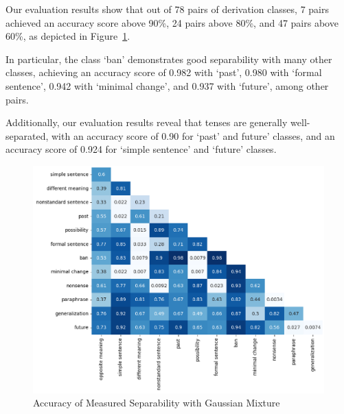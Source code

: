 \documentclass[11pt]{article}
\begin{document}
Our evaluation results show that out of 78 pairs of derivation classes, 7 pairs
achieved an accuracy score above 90\%, 24 pairs above 80\%, and 47 pairs above
60\%, as depicted in Figure~\ref{fig:GM}.

In particular, the class `ban' demonstrates good separability with many other
classes, achieving an accuracy score of 0.982 with `past', 0.980 with `formal
sentence', 0.942 with `minimal change', and 0.937 with `future', among other
pairs.

Additionally, our evaluation results reveal that tenses are generally
well-separated, with an accuracy score of 0.90 for `past' and future' classes,
and an accuracy score of 0.924 for `simple sentence' and `future' classes.

\begin{figure}[htp]
    \centering
    \includegraphics[scale=0.4]{figs/GM.png}
    \caption{Accuracy of Measured Separability with Gaussian
    Mixture}\label{fig:GM}
\end{figure}






\end{document}
